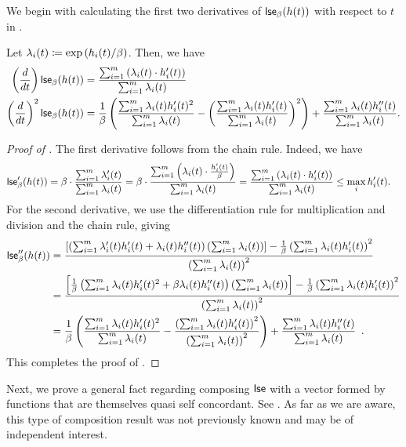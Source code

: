 We begin with calculating the first two derivatives of $\mathsf{lse}_{\beta}(h(t))$ with respect to $t$ in .
\begin{lemma}
\label{lemma:lse_first_two}
Let $\lambda_i(t) \coloneqq \mathrm{exp}\left(h_i(t)/\beta\right)$. Then, we have
\begin{align*}
    \left(\frac{d}{dt}\right)\mathsf{lse}_{\beta}(h(t)) &= \frac{\sum_{i=1}^m \left(\lambda_i(t) \cdot h_i'(t)\right)}{\sum_{i=1}^m \lambda_i(t)} \\
    \left(\frac{d}{dt}\right)^2\mathsf{lse}_{\beta}(h(t)) &= \frac{1}{\beta}\left(\frac{\sum_{i=1}^m \lambda_i(t)h_i'(t)^2}{\sum_{i=1}^m \lambda_i(t)} - \left(\frac{\sum_{i=1}^m \lambda_i(t)h_i'(t)}{\sum_{i=1}^m \lambda_i(t)}\right)^2\right) + \frac{\sum_{i=1}^m \lambda_i(t)h_i''(t)}{\sum_{i=1}^m \lambda_i(t)}.
\end{align*}
\end{lemma}
\begin{proof}[Proof of ]
The first derivative follows from the chain rule. Indeed, we have
\begin{align*}
    \mathsf{lse}_{\beta}'(h(t)) &= \beta \cdot \frac{\sum_{i=1}^m \lambda_i'(t)}{\sum_{i=1}^m \lambda_i(t)} = \beta \cdot \frac{\sum_{i=1}^m \left(\lambda_i(t) \cdot \frac{h_i'(t)}{\beta}\right)}{\sum_{i=1}^m \lambda_i(t)} = \frac{\sum_{i=1}^m \left(\lambda_i(t) \cdot h_i'(t)\right)}{\sum_{i=1}^m \lambda_i(t)} \le \max_{i} h_i'(t).
\end{align*}
For the second derivative, we use the differentiation rule for multiplication and division and the chain rule, giving
\begin{align*}
    \mathsf{lse}_{\beta}''(h(t)) &= \frac{\left[\left(\sum_{i=1}^m \lambda_i'(t)h_i'(t)+\lambda_i(t)h_i''(t)\right)\left(\sum_{i=1}^m \lambda_i(t)\right)\right] - \frac{1}{\beta}\left(\sum_{i=1}^m \lambda_i(t)h_i'(t)\right)^2}{\left(\sum_{i=1}^m \lambda_i(t)\right)^2} \\
    &= \frac{\left[\frac{1}{\beta}\left(\sum_{i=1}^m \lambda_i(t)h_i'(t)^2+\beta\lambda_i(t)h_i''(t)\right)\left(\sum_{i=1}^m \lambda_i(t)\right)\right] - \frac{1}{\beta}\left(\sum_{i=1}^m \lambda_i(t)h_i'(t)\right)^2}{\left(\sum_{i=1}^m \lambda_i(t)\right)^2} \\
    &= \frac{1}{\beta}\left(\frac{\sum_{i=1}^m \lambda_i(t)h_i'(t)^2}{\sum_{i=1}^m \lambda_i(t)} - \frac{\left(\sum_{i=1}^m \lambda_i(t)h_i'(t)\right)^2}{\left(\sum_{i=1}^m \lambda_i(t)\right)^2}\right) + \frac{\sum_{i=1}^m \lambda_i(t)h_i''(t)}{\sum_{i=1}^m \lambda_i(t)}\enspace.
\end{align*}
This completes the proof of .
\end{proof}
Next, we prove a general fact regarding composing $\mathsf{lse}$ with a vector formed by functions that are themselves quasi self concordant. See .
\composedqsc
As far as we are aware, this type of composition result was not previously known and may be of independent interest.

